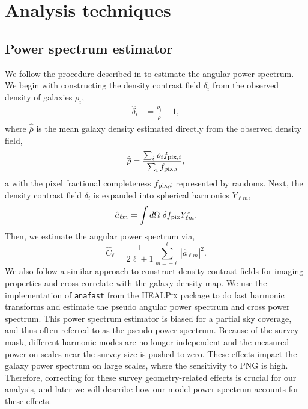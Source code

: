 \section{Analysis techniques}
\label{sec:method} 
 
\subsection{Power spectrum estimator}
We follow the procedure described in \cite{hivon2002master} to estimate the angular power spectrum. We begin with constructing the density contrast field $\delta_{i}$ from the observed density of galaxies $\rho_{i}$,
\begin{align}\label{eq:delta}
    \hat{\delta}_{i} &= \frac{\rho_{i}}{\hat{\overline{\rho}}} - 1,
\end{align}
where $\hat{\overline{\rho}}$ is the mean galaxy density estimated directly from the observed density field,
\begin{equation}\label{eq:nbar}
\hat{\overline{\rho}} = \frac{\sum_{i}\rho_{i}f_{{\rm pix},i}}{\sum_{i}f_{{\rm pix},i}},
\end{equation}a
with the pixel fractional completeness $f_{{\rm pix},i}$ represented by randoms. Next, the density contrast field $\delta_{i}$ is expanded into spherical harmonics $Y_{\ell m}$, 
\begin{equation}
        \hat{a}_{\ell m} = \int d\Omega ~ \delta f_{\rm pix} Y^{*}_{\ell m}.
\end{equation}
Then, we estimate the angular power spectrum via,
\begin{equation}\label{eq:pusedocell}
        \hat{C}_{\ell} = \frac{1}{2\ell +1} \sum_{m=-\ell}^{\ell} |\hat{a}_{\ell m}|^{2}.
\end{equation}
We also follow a similar approach to construct density contrast fields for imaging properties and cross correlate with the galaxy density map. We use the implementation of \texttt{anafast} from the \textsc{HEALPix} package \citep{gorski2005healpix} to do fast harmonic transforms and estimate the pseudo angular power spectrum and cross power spectrum. This power spectrum estimator is biased for a partial sky coverage, and thus often referred to as the pseudo power spectrum. Because of the survey mask, different harmonic modes are no longer independent and the measured power on scales near the survey size is pushed to zero. These effects impact the galaxy power spectrum on large scales, where the sensitivity to PNG is high. Therefore, correcting for these survey geometry-related effects is crucial for our analysis, and later we will describe how our model power spectrum accounts for these effects. 

